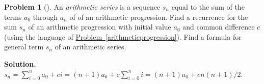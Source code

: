 \documentclass[10pt,]{book}
\theoremstyle{plain}
\theoremstyle{definition}
\newtheorem{activity}[project]{Problem}
\theoremstyle{definition}
\numberwithin{equation}{chapter}
\begin{document}
\begin{activity}[]\label{activity-96}
An \emph{arithmetic series} is a sequence \(s_n\) equal to the sum of the terms \(a_0\) through \(a_n\) of of an arithmetic progression. Find a recurrence for the sum \(s_n\) of an arithmetic progression with initial value \(a_0\) and common difference \(c\) (using the language of \hyperref[arithmeticprogression]{Problem~\ref{arithmeticprogression}}). Find a formula for general term \(s_n\) of an arithmetic series.%
\par\medskip\noindent%
\textbf{Solution.}\quad \(s_n=\sum_{i=0}^n a_0 +ci =(n+1)a_0+c\sum_{i=0}^n i = (n+1)a_0
+cn(n+1)/2\).%
\end{activity}
\typeout{************************************************}
\typeout{************************************************}
\end{document}
